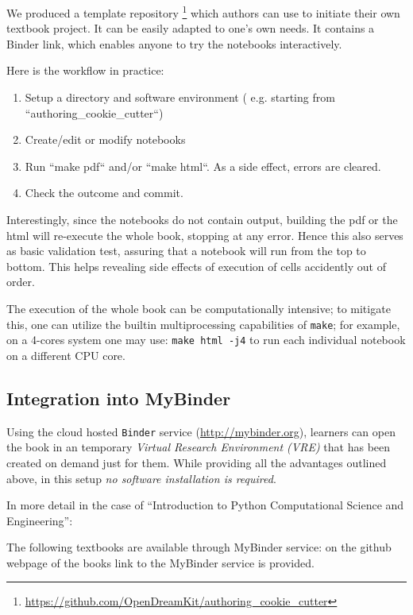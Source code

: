 \documentclass{deliverablereport}
\begin{document}
{{{We produced a template repository \footnote{\scriptsize
  \url{https://github.com/OpenDreamKit/authoring_cookie_cutter}} which
authors can use to initiate their own textbook project. It can be
easily adapted to one's own needs. It contains a Binder link, which
enables anyone to try the notebooks interactively.

Here is the workflow in practice:
\begin{enumerate}
\item Setup a directory and software environment ( e.g. starting from
  ``authoring\_cookie\_cutter``)
\item Create/edit or modify notebooks
\item Run ``make pdf`` and/or ``make html``. As a side effect, errors
  are cleared.
\item Check the outcome and commit.
\end{enumerate}

Interestingly, since the notebooks do not contain output, building the
pdf or the html will re-execute the whole book, stopping at any error.
Hence this also serves as basic validation test, assuring that a
notebook will run from the top to bottom. This helps revealing side
effects of execution of cells accidently out of order.

The execution of the whole book can be computationally intensive; to
mitigate this, one can utilize the builtin multiprocessing
capabilities of \texttt{make}; for example, on a 4-cores system one
may use: \texttt{make html -j4} to run each individual notebook on a
different CPU core.

\subsection{Integration into MyBinder}



Using the cloud hosted \texttt{Binder} service
(\url{http://mybinder.org}), learners can open the book in an
temporary \emph{Virtual Research Environment (VRE)} that has been
created on demand just for them. While providing all the advantages
outlined above, in this setup \emph{no software installation is
  required}.

In more detail in the case of ``Introduction to Python Computational
Science and Engineering'':




The following textbooks are available through MyBinder service: on the
github webpage of the books link to the MyBinder service is provided.

}}}
\end{document}
